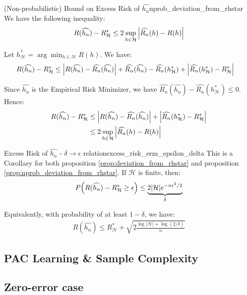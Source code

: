 \begin{proposition}{(Non-probabilistic) Bound on Excess Risk of $\widehat{h_n}$}{nprob_deviation_from_rhstar}
    We have the following inequality:
    \begin{align*}
        R(\widehat{h_n}) - R_\mathcal{H}^* \le 2\sup_{h\in\mathcal{H}} \Big| 
            \widehat{R_n}(h) - R(h)
         \Big|
    \end{align*}
\end{proposition}

\begin{proof*}
    Let $h_\mathcal{H}^* = \arg\min_{h\in\mathcal{H}}R(h)$. We have:
    \begin{align*}
        R(\widehat{h_n}) - R_\mathcal{H}^* 
            &\le 
                \Big| R(\widehat{h_n}) - \widehat{R_n}(\widehat{h_n}) \Big| 
                + \widehat{R_n}(\widehat{h_n}) - \widehat{R_n}(h_\mathcal{H}^*) 
                + \Big| \widehat{R_n}(h_\mathcal{H}^*) - R_\mathcal{H}^* \Big|
    \end{align*}

    \noindent Since $\widehat{h_n}$ is the Empirical Risk Minimizer, we have $\widehat{R_n}(\widehat{h_n}) - \widehat{R_n}(h_\mathcal{H}^*) \le 0$. Hence:
    \begin{align*}
        R(\widehat{h_n}) - R_\mathcal{H}^* 
            &\le   
                \Big| R(\widehat{h_n}) - \widehat{R_n}(\widehat{h_n}) \Big| 
                + \Big| \widehat{R_n}(h_\mathcal{H}^*) - R_\mathcal{H}^* \Big| \\
            &\le 
                2\sup_{h\in\mathcal{H}}\Big| 
                    \widehat{R_n}(h) - R(h)
                 \Big|
    \end{align*}
\end{proof*}

\begin{corollary}{Excess Risk of $\widehat{h_n}$ - $\delta \to \epsilon$ relation}{excess_risk_erm_epsilon_delta}
    This is a Corollary for both proposition \ref{prop:deviation_from_rhstar} and proposition \ref{prop:nprob_deviation_from_rhstar}. If $\mathcal{H}$ is finite, then:
    \begin{align*}
        P\Big( 
            R(\widehat{h_n}) - R_\mathcal{H}^* \ge \epsilon
         \Big) \le \underbrace{2|\mathcal{H}|e^{-n\epsilon^2/2}}_{\delta}
    \end{align*}

    \noindent Equivalently, with probability of at least $1-\delta$, we have:
    \begin{align*}
        R(\widehat{h_n}) \le R_\mathcal{H}^* + \sqrt{
            2\frac{\log|\mathcal{H}| + \log(2/\delta)}{n}
        }
    \end{align*}
\end{corollary}

\begin{proof*}
    
\end{proof*}


\subsection{PAC Learning \& Sample Complexity}

\subsection{Zero-error case}

